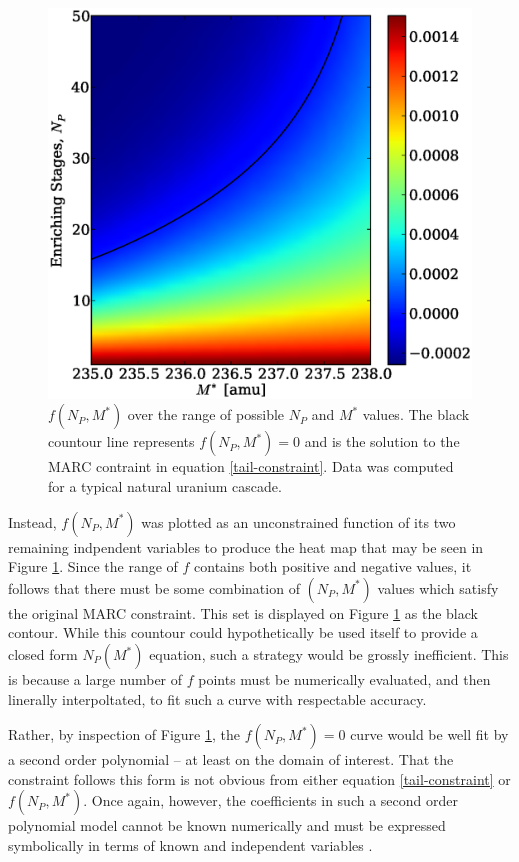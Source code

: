\documentclass[preprint,12pt]{elsarticle}
\begin{document}
\begin{figure}[htpb]
\begin{center}
\includegraphics[scale=0.5]{np_constraint.eps}
\caption{$f(N_P, M^*)$ over the range of possible $N_P$ and $M^*$ values.  The black
countour line represents $f(N_P, M^*)=0$ and is the solution to the MARC contraint
in equation \ref{tail-constraint}. 
Data was computed for a typical natural uranium cascade.}
\label{np_contraint_fig}
\end{center}
\end{figure}

Instead, $f(N_P,M^*)$ was plotted as an unconstrained function of its two remaining 
indpendent variables to produce the heat map that may be seen in Figure 
\ref{np_contraint_fig}.  Since the range of $f$ contains both positive and negative
values, it follows that there must be some combination of $(N_P,M^*)$ values which
satisfy the original MARC constraint.  This set is displayed on Figure 
\ref{np_contraint_fig} as the black contour.  While this countour could hypothetically
be used itself to provide a closed form $N_P(M^*)$ equation, such a strategy would 
be grossly inefficient.  This is because a large number of $f$ points must be 
numerically evaluated, and then linerally interpoltated, to fit such a curve with
respectable accuracy.

Rather, by inspection of Figure \ref{np_contraint_fig}, the $f(N_P, M^*)=0$ curve 
would be well fit by a second order polynomial -- at least on the domain of interest.
That the constraint follows this form is not obvious from either equation 
\ref{tail-constraint} or $f(N_P,M^*)$.  Once again, however, the coefficients in 
such a second order polynomial model cannot be known numerically and must be 
expressed symbolically in terms of known and independent variables 
\cite{Sacks:1989:ASS:1623755.1623823}.
\end{document}

